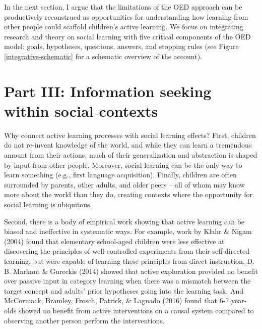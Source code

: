 \documentclass[oneside]{report}
\begin{document}
In the next section, I argue that the limitations of the OED approach
can be productively reconstrued as opportunities for understanding how
learning from other people could scaffold children's active learning. We
focus on integrating research and theory on social learning with five
critical components of the OED model: goals, hypotheses, questions,
answers, and stopping rules (see Figure \ref{integrative-schematic} for
a schematic overview of the account).

\hypertarget{active_social}{\section{Part III: Information seeking
within social contexts}\label{active_social}}

Why connect active learning processes with social learning effects?
First, children do not re-invent knowledge of the world, and while they
can learn a tremendous amount from their actions, much of their
generalization and abstraction is shaped by input from other people.
Moreover, social learning can be the only way to learn something (e.g.,
first language acquisition). Finally, children are often surrounded by
parents, other adults, and older peers -- all of whom may know more
about the world than they do, creating contexts where the opportunity
for social learning is ubiquitous.

Second, there is a body of empirical work showing that active learning
can be biased and ineffective in systematic ways. For example, work by
Klahr \& Nigam (2004) found that elementary school-aged children were
less effective at discovering the principles of well-controlled
experiments from their self-directed learning, but were capable of
learning these principles from direct instruction. D. B. Markant \&
Gureckis (2014) showed that active exploration provided no benefit over
passive input in category learning when there was a mismatch between the
target concept and adults' prior hypotheses going into the learning
task. And McCormack, Bramley, Frosch, Patrick, \& Lagnado (2016) found
that 6-7 year-olds showed no benefit from active interventions on a
causal system compared to observing another person perform the
interventions.
\end{document}
